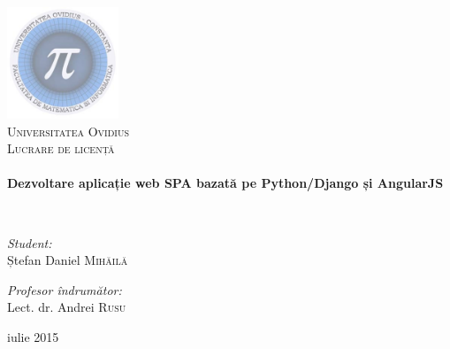 \begin{titlepage}
\begin{center}

\includegraphics[width=0.25\textwidth]{./logo}~\\[1cm]

\textsc{\LARGE Universitatea Ovidius}\\[1.5cm]

\textsc{\Large Lucrare de licență}\\[0.5cm]

\HRule \\[0.4cm]
{ \huge \bfseries Dezvoltare aplicație web SPA bazată pe Python/Django și AngularJS \\[0.4cm] }

\HRule \\[1.5cm]

\noindent
\begin{minipage}[t]{0.4\textwidth}
\begin{flushleft} \large
\emph{Student:}\\
Ștefan Daniel \textsc{Mihăilă}
\end{flushleft}
\end{minipage}%
\begin{minipage}[t]{0.4\textwidth}
\begin{flushright} \large
\emph{Profesor îndrumător:} \\
Lect. dr. Andrei \textsc{Rusu}
\end{flushright}
\end{minipage}

\vfill

{\large iulie 2015}

\end{center}
\end{titlepage}